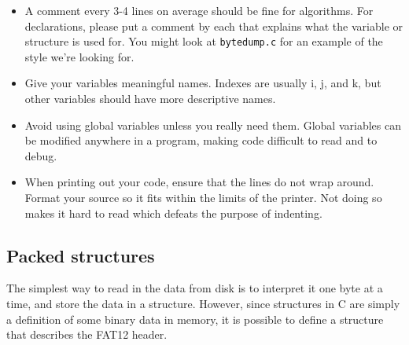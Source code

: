 \documentclass[letterpaper,10pt]{article}
\begin{document}
\begin{itemize}
\item A comment every 3-4 lines on average should be fine for algorithms. For declarations,
please put a comment by each that explains what the variable or structure is used for.
You might look at \verb+bytedump.c+ for an example of the style we’re looking for.

\item Give your variables meaningful names. Indexes are usually i, j, and k, but other variables
should have more descriptive names.

\item Avoid using global variables unless you really need them. Global variables can be
modified anywhere in a program, making code difficult to read and to debug.

\item When printing out your code, ensure that the lines do not wrap around. Format your
source so it fits within the limits of the printer. Not doing so makes it hard to read which
defeats the purpose of indenting.
\end{itemize}



\subsection{Packed structures}
The simplest way to read in the data from disk is to interpret it one byte at a time,
and store the data in a structure. However, since structures in C are simply
a definition of some binary data in memory, it is possible to define a structure that
describes the FAT12 header.
\end{document}

